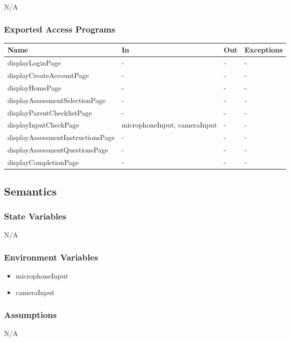 \documentclass[12pt, titlepage]{article}
\begin{document}
N/A

\subsubsection{Exported Access Programs}

\begin{center}
\begin{tabular}{p{8cm} p{4cm} p{2cm} p{2cm}}
\hline
\textbf{Name} & \textbf{In} & \textbf{Out} & \textbf{Exceptions} \\
\hline
displayLoginPage & - & - & - \\
displayCreateAccountPage & - & - & - \\
displayHomePage & - & - & - \\
displayAssessmentSelectionPage & - & - & - \\
displayParentChecklistPage & - & - & - \\
displayInputCheckPage & microphoneInput, cameraInput & - & - \\
displayAssessmentInstructionsPage & - & - & - \\
displayAssessmentQuestionsPage & - & - & - \\
displayCompletionPage & - & - & - \\
\hline
\end{tabular}
\end{center}

\subsection{Semantics}

\subsubsection{State Variables}
N/A

\subsubsection{Environment Variables}
\begin{itemize}
  \item microphoneInput
  \item cameraInput
\end{itemize}

\subsubsection{Assumptions}
N/A
\end{document}
